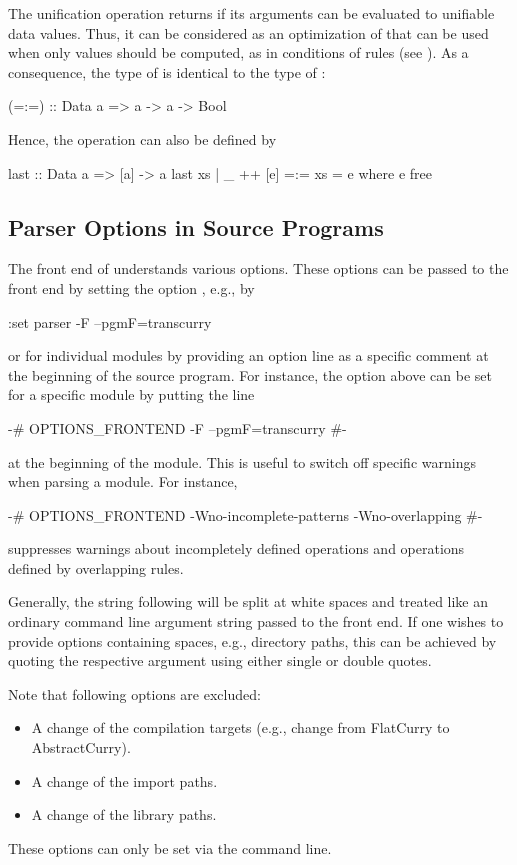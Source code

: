 The unification operation \ccode{=:=} returns 
if its arguments can be evaluated to unifiable data values.
Thus, it can be considered as an optimization of \ccode{===}
that can be used when only  values should be computed,
as in conditions of rules (see \cite{AntoyHanus17FAoC}).
As a consequence, the type of \ccode{=:=} is identical
to the type of \ccode{===}:
%
\begin{curry}
(=:=) :: Data a => a -> a -> Bool
\end{curry}
%
Hence, the operation  can also be defined by
%
\begin{curry}
last :: Data a => [a] -> a
last xs | _ ++ [e] =:= xs = e
  where e free
\end{curry}
%

\subsection{Parser Options in Source Programs}

The front end of \CYS understands various options.
These options can be passed to the front end by setting
the \CYS option , e.g., by
%
\begin{curry}
:set parser -F --pgmF=transcurry
\end{curry}
%
or for individual modules by providing an option line as a specific
comment at the beginning of the source program.
For instance, the option above can be set for a specific module
by putting the line
%
\begin{curry}
{-# OPTIONS_FRONTEND -F --pgmF=transcurry #-}
\end{curry}
%
at the beginning of the module.
This is useful to switch off specific warnings when parsing a module.
For instance, 
%
\begin{curry}
{-# OPTIONS_FRONTEND -Wno-incomplete-patterns -Wno-overlapping #-}
\end{curry}
%
suppresses warnings about incompletely defined operations
and operations defined by overlapping rules.

Generally, the string following 
will be split at white spaces and treated like an ordinary
command line argument string passed to the front end.
If one wishes to provide options containing spaces, e.g., directory paths,
this can be achieved by quoting the respective argument
using either single or double quotes.

Note that following options are excluded:
\begin{itemize}
\item A change of the compilation targets
      (e.g., change from FlatCurry to AbstractCurry).
\item A change of the import  paths.
\item A change of the library paths.
\end{itemize}
%
These options can only be set via the command line.



